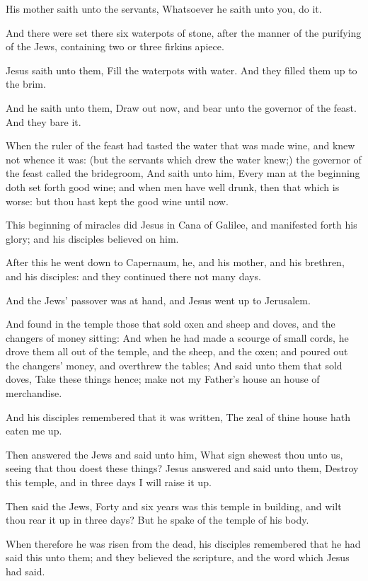 \verse His mother saith unto the servants, Whatsoever he saith unto you, do it.

\verse And there were set there six waterpots of stone, after the manner of the purifying of the Jews, containing two or three firkins apiece.

\verse Jesus saith unto them, Fill the waterpots with water. And they filled them up to the brim.

\verse And he saith unto them, Draw out now, and bear unto the governor of the feast. And they bare it.

\verse When the ruler of the feast had tasted the water that was made wine, and knew not whence it was: (but the servants which drew the water knew;) the governor of the feast called the bridegroom, \verse And saith unto him, Every man at the beginning doth set forth good wine; and when men have well drunk, then that which is worse: but thou hast kept the good wine until now.

\verse This beginning of miracles did Jesus in Cana of Galilee, and manifested forth his glory; and his disciples believed on him.

\verse After this he went down to Capernaum, he, and his mother, and his brethren, and his disciples: and they continued there not many days.

\verse And the Jews' passover was at hand, and Jesus went up to Jerusalem.

\verse And found in the temple those that sold oxen and sheep and doves, and the changers of money sitting: \verse And when he had made a scourge of small cords, he drove them all out of the temple, and the sheep, and the oxen; and poured out the changers' money, and overthrew the tables; \verse And said unto them that sold doves, Take these things hence; make not my Father's house an house of merchandise.

\verse And his disciples remembered that it was written, The zeal of thine house hath eaten me up.

\verse Then answered the Jews and said unto him, What sign shewest thou unto us, seeing that thou doest these things?  \verse Jesus answered and said unto them, Destroy this temple, and in three days I will raise it up.

\verse Then said the Jews, Forty and six years was this temple in building, and wilt thou rear it up in three days?  \verse But he spake of the temple of his body.

\verse When therefore he was risen from the dead, his disciples remembered that he had said this unto them; and they believed the scripture, and the word which Jesus had said.

